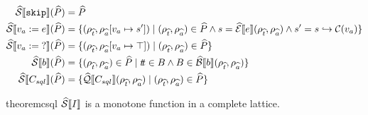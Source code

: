 \begin{align}
    \widehat{\mathcal{S}} \llbracket \texttt{skip} \rrbracket(\widehat{P}) &= \widehat{P} \\
    \widehat{\mathcal{S}} \llbracket v_a := e \rrbracket(\widehat{P}) &= \{(\rho_{\widehat{t}}, \rho_{\widehat{a}}[v_a \mapsto s']) \mid (\rho_{\widehat{t}}, \rho_{\widehat{a}}) \in \widehat{P} \land s = \widehat{\mathcal{E}}\llbracket e \rrbracket(\rho_{\widehat{t}}, \rho_{\widehat{a}}) \land s' = s \hookrightarrow \mathcal{C}(v_a) \} \\
    \widehat{\mathcal{S}} \llbracket v_a := \; ? \rrbracket(\widehat{P}) &= \{(\rho_{\widehat{t}}, \rho_{\widehat{a}}[v_a \mapsto \top]) \mid (\rho_{\widehat{t}}, \rho_{\widehat{a}}) \in \widehat{P} \} \\
    \widehat{\mathcal{S}} \llbracket b \rrbracket(\widehat{P}) &= \{ (\rho_{\widehat{t}}, \rho_{\widehat{a}}) \in \widehat{P} \mid t\!t \in B \land B \in \widehat{\mathcal{B}}\llbracket b \rrbracket(\rho_{\widehat{t}}, \rho_{\widehat{a}}) \} \\
    \widehat{\mathcal{S}} \llbracket C_{sql} \rrbracket(\widehat{P}) &= \{\widehat{\mathcal{Q}}\llbracket C_{sql} \rrbracket(\rho_{\widehat{t}}, \rho_{\widehat{a}}) \mid (\rho_{\widehat{t}}, \rho_{\widehat{a}}) \in \widehat{P} \}
\end{align}

\begin{restatable}{theorem}{csql}\label{thm:csql}
    $\widehat{\mathcal{S}} \llbracket I \rrbracket$ is a monotone function in a complete lattice.
\end{restatable}

